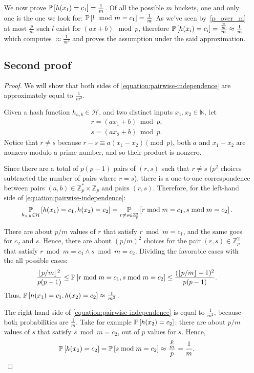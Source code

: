 We now prove $\operatorname*{\mathbb{P}}\left[{h(x_{1}) = c_{1}}\right] = \frac{1}{m}$.
Of all the possible $m$ buckets, one and only one is the one we look for: $\operatorname*{\mathbb{P}}\left[{l \mod m = c_{1}}\right] = \frac{1}{m}$
As we've seen by~\ref{p_over_m} at most $\frac{p}{m}$ such $l$ exist for $(a x + b) \mod p$, therefore $\operatorname*{\mathbb{P}}\left[{h(x_i) = c_{i}}\right] = \frac{\frac{p}{m}}{m} \approx \frac{1}{m}$ which computes $\approx \frac{1}{m^{2}}$ and proves the assumption under the said approximation.

\subsection{Second proof}

\begin{proof}
We will show that both sides of  \eqref{equation:pairwise-independence} are approximately equal to $\frac{1}{m^2}$.

Given a hash function $h_{a,b} \in \mathcal{H}$, and two distinct inputs $x_1, x_2 \in \mathbb{N}$, let
\begin{align*}
  r = (a x_1 + b) \bmod p,\\
  s = (a x_2 + b) \bmod p.
\end{align*}
Notice that $r \ne s$ because $r - s \equiv a(x_1-x_2) \pmod p $,  both $a$ and $x_1-x_2$ are nonzero modulo a prime number, and so their product is nonzero.

Since there are a total of $p(p-1)$ pairs of $(r, s)$ such that $r \ne s$ ($p^2$ choices subtracted the number of pairs where $r=s$), there is a one-to-one correspondence between pairs $(a, b)\in \mathbb{Z}_p^*\times\mathbb{Z}_p$ and pairs $(r, s)$. Therefore, for the left-hand side of \eqref{equation:pairwise-independence}:
$$\operatorname*{\mathbb{P}}_{h_{a,b}\in\mathcal{H}}\left[{h(x_1)= c_1, h(x_2) = c_2}\right] = \operatorname*{\mathbb{P}}_{r\ne s\in\mathbb{Z}_p^2}\left[{r \bmod m = c_1, s \bmod m = c_2}\right].$$

There are about $p / m$ values of $r$ that satisfy $r \bmod m=c_1$, and the same goes for $c_2$ and $s$. Hence, there are about $(p / m)^2$ choices for the pair $(r, s) \in \mathbb{Z}_p^2$ that satisfy $r \bmod m = c_1 \wedge s \bmod m = c_2$. Dividing the favorable cases with the all possible cases:
$$\frac{\lfloor p / m \rfloor^2}{p(p-1)}\le\operatorname*{\mathbb{P}}\left[{r \bmod m = c_1, s \bmod m = c_2}\right]\le \frac{(\lfloor p / m \rfloor + 1)^2}{p(p-1)}.$$
Thus, $\operatorname*{\mathbb{P}}\left[{h(x_1)= c_1, h(x_2) = c_2}\right]\approx \frac{1}{m^2}$.

\vspace{10pt}
The right-hand side of \eqref{equation:pairwise-independence} is equal to  $\frac{1}{m^2}$, because both probabilities are $\frac{1}{m}$. Take for example $\operatorname*{\mathbb{P}}\left[{h(x_2) = c_2}\right]$: there are about $p / m$ values of $s$ that satisfy $s \bmod m = c_2$, out of $p$ values for $s$. Hence,
$$\operatorname*{\mathbb{P}}\left[{h(x_2) = c_2}\right] = \operatorname*{\mathbb{P}}\left[{s \bmod m = c_2}\right] \approx \frac{\frac{p}{m}}{p} = \frac{1}{m}.$$


\end{proof}